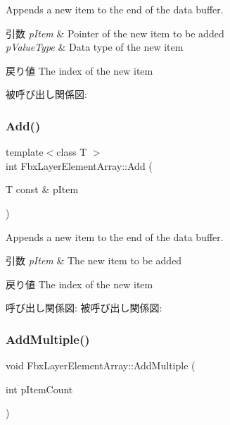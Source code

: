 Appends a new item to the end of the data buffer. 
\begin{DoxyParams}{引数}
{\em p\+Item} & Pointer of the new item to be added \\
\hline
{\em p\+Value\+Type} & Data type of the new item \\
\hline
\end{DoxyParams}
\begin{DoxyReturn}{戻り値}
The index of the new item 
\end{DoxyReturn}
被呼び出し関係図\+:
\mbox{\label{class_fbx_layer_element_array_aa7749da74c326ba0961f0a29a7ef2258}} 
\subsubsection{\texorpdfstring{Add()}{Add()}\hspace{0.1cm}{\footnotesize\ttfamily [2/2]}}
{\footnotesize\ttfamily template$<$class T $>$ \\
int Fbx\+Layer\+Element\+Array\+::\+Add (\begin{DoxyParamCaption}\item[{T const \&}]{p\+Item }\end{DoxyParamCaption})}

Appends a new item to the end of the data buffer. 
\begin{DoxyParams}{引数}
{\em p\+Item} & The new item to be added \\
\hline
\end{DoxyParams}
\begin{DoxyReturn}{戻り値}
The index of the new item 
\end{DoxyReturn}
呼び出し関係図\+:
被呼び出し関係図\+:
\mbox{\label{class_fbx_layer_element_array_a53c4b42b43239dc99f82625b1fb65774}} 
\subsubsection{\texorpdfstring{Add\+Multiple()}{AddMultiple()}}
{\footnotesize\ttfamily void Fbx\+Layer\+Element\+Array\+::\+Add\+Multiple (\begin{DoxyParamCaption}\item[{int}]{p\+Item\+Count }\end{DoxyParamCaption})}

